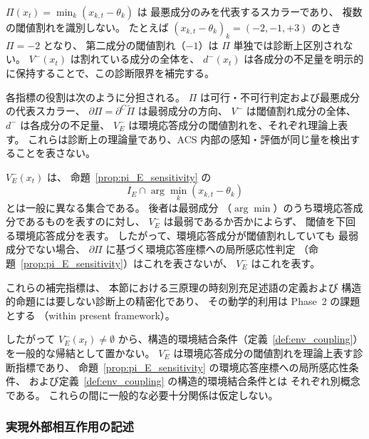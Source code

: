 \begin{remark}
\label{rem:diagnostic_role}
$\Pi(x_t)=\min_k(x_{k,t}-\theta_k)$ は
最悪成分のみを代表するスカラーであり、
複数の閾値割れを識別しない。
たとえば
$(x_{k,t}-\theta_k)_k=(-2,-1,+3)$ のとき
$\Pi=-2$ となり、
第二成分の閾値割れ（$-1$）は $\Pi$ 単独では診断上区別されない。
$V^-(x_t)$ は割れている成分の全体を、
$d^-(x_t)$ は各成分の不足量を明示的に保持することで、この診断限界を補完する。

各指標の役割は次のように分担される。
$\Pi$ は可行・不可行判定および最悪成分の代表スカラー、
$\partial\Pi=\partial^C\widetilde{\Pi}$ は最弱成分の方向、
$V^-$ は閾値割れ成分の全体、
$d^-$ は各成分の不足量、
$V^-_E$ は環境応答成分の閾値割れを、それぞれ理論上表す。
これらは診断上の理論量であり、ACS 内部の感知・評価が同じ量を検出することを表さない。

$V^-_E(x_t)$ は、
命題~\ref{prop:pi_E_sensitivity} の
\[
  I_E\cap
  \arg\min_k(x_{k,t}-\theta_k)
\]
とは一般に異なる集合である。
後者は最弱成分
（$\arg\min$）のうち環境応答成分であるものを表すのに対し、
$V^-_E$ は最弱であるか否かによらず、
閾値を下回る環境応答成分を表す。
したがって、環境応答成分が閾値割れしていても
最弱成分でない場合、
$\partial\Pi$ に基づく環境応答座標への局所感応性判定
（命題~\ref{prop:pi_E_sensitivity}）はこれを表さないが、
$V^-_E$ はこれを表す。

これらの補完指標は、
本節における三原理の時刻別充足述語の定義および
構造的命題には要しない診断上の精密化であり、
その動学的利用は Phase~2 の課題とする
（within present framework）。

したがって
$V^-_E(x_t)\neq\emptyset$
から、構造的環境結合条件（定義~\ref{def:env_coupling}）を一般的な帰結として置かない。
$V^-_E$ は環境応答成分の閾値割れを理論上表す診断指標であり、
命題~\ref{prop:pi_E_sensitivity} の環境応答座標への局所感応性条件、
および定義~\ref{def:env_coupling} の構造的環境結合条件とは
それぞれ別概念である。
これらの間に一般的な必要十分関係は仮定しない。
\end{remark}

\subsubsection{実現外部相互作用の記述}

